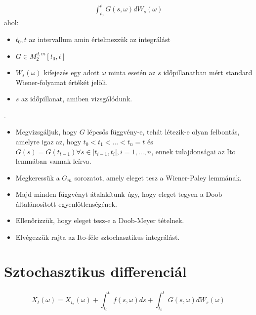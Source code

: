 \documentclass[11pt,a4paper]{article}
\begin{document}
				\paragraph{}
					$$\begin{aligned}
						\int_{t_0}^t G(s,\omega) dW_s(\omega)
					\end{aligned}$$
					ahol:
						\begin{itemize}
						\item $t_0, t$ az intervallum amin értelmezzük az integrálást
						\item $G \in M_2^{d,m}[t_0,t]$
						\item $W_s(\omega)$ kifejezés egy adott $\omega$ minta esetén az $s$ időpillanatban mért standard Wiener-folyamat értékét jelöli.
						\item $s$ az időpillanat, amiben vizsgálódunk.
					\end{itemize}.
					\begin{itemize}
						\item Megvizsgáljuk, hogy $G$ lépcsős függvény-e, tehát létezik-e olyan felbontás, amelyre igaz az, hogy $t_0 < t_1 < \dots < t_n = t$ és $G(s) = G(t_{t-1}) \forall s \in [t_{i-1},t_i[, i=1,\dots,n$, ennek tulajdonságai az Ito lemmában vannak leírva.
						\item Megkeressük a $G_m$ sorozatot, amely eleget tesz a Wiener-Paley lemmának.
						\item Majd minden függvényt átalakítunk úgy, hogy eleget tegyen a Doob általánosított egyenlőtlenségének.
						\item Ellenőrizzük, hogy eleget tesz-e a Doob-Meyer tételnek.
						\item Elvégezzük rajta az Ito-féle sztochasztikus integrálást.
					\end{itemize}
			\section{Sztochasztikus differenciál}
				\paragraph{}
					$$X_t(\omega) = X_{t_s}(\omega) + \int_{t_0}^t f(s, \omega)ds + \int_{t_0}^t G(s, \omega) dW_s(\omega)$$
					
\end{document}
